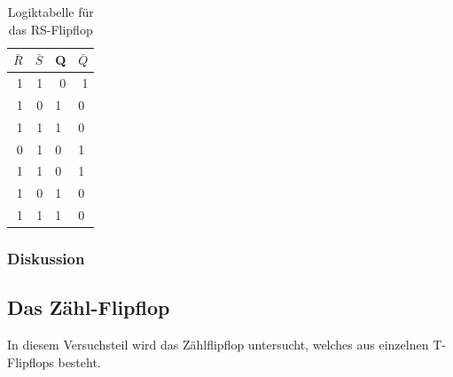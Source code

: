 \documentclass[12pt,a4paper]{article}
\begin{document}
\begin{table}[H]
\begin{center}
\begin{tabular}{r|r|l|l}

\multicolumn{1}{l|}{$\bar{R}$} & \multicolumn{1}{l|}{$\bar{S}$} & Q & $\bar{Q}$ \\ \hline \hline
1 & 1 & \multicolumn{1}{r|}{0} & \multicolumn{1}{r}{1} \\ 
1 & 0 & 1 & 0 \\ 
1 & 1 & 1 & 0 \\ 
0 & 1 & 0 & 1 \\ 
1 & 1 & 0 & 1 \\ 
1 & 0 & 1 & 0 \\ 
1 & 1 & 1 & 0 \\ 
\end{tabular}
\end{center}
\caption{Logiktabelle für das RS-Flipflop}
\label{tab:2_5}
\end{table}


\subsubsection*{Diskussion}

\subsection{Das Zähl-Flipflop}
In diesem Versuchsteil wird das Zählflipflop untersucht, welches aus einzelnen T-Flipflops besteht.
\end{document}
